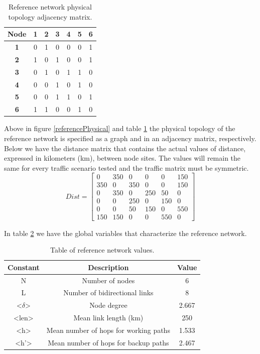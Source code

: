\begin{table}[H]
\centering
\begin{tabular}{|c|c|c|c|c|c|c|}
\hline
\textbf{Node} & \textbf{1} & \textbf{2} & \textbf{3} & \textbf{4} & \textbf{5} & \textbf{6} \\ \hline
\textbf{1} & 0 & 1 & 0 & 0 & 0 & 1 \\ \hline
\textbf{2} & 1 & 0 & 1 & 0 & 0 & 1 \\ \hline
\textbf{3} & 0 & 1 & 0 & 1 & 1 & 0 \\ \hline
\textbf{4} & 0 & 0 & 1 & 0 & 1 & 0 \\ \hline
\textbf{5} & 0 & 0 & 1 & 1 & 0 & 1 \\ \hline
\textbf{6} & 1 & 1 & 0 & 0 & 1 & 0 \\ \hline
\end{tabular}
\caption{Reference network physical topology adjacency matrix.}
\label{referenceAdjacency}
\end{table}

Above in figure \ref{referencePhysical} and table \ref{referenceAdjacency} the physical topology of the reference network is specified as a graph and in an adjacency matrix, respectively. Below we have the distance matrix that contains the actual values of distance, expressed in kilometers (km), between node sites. The values will remain the same for every traffic scenario tested and the traffic matrix must be symmetric.  
\[
Dist=
  \begin{bmatrix}
    0 & 350 & 0 & 0 & 0 & 150 \\
    350 & 0 & 350 & 0 & 0 & 150 \\
    0 & 350 & 0 & 250 & 50 & 0 \\
    0 & 0 & 250 & 0 & 150 & 0 \\
    0 & 0 & 50 & 150 & 0 & 550 \\
    150 & 150 & 0 & 0 & 550 & 0
  \end{bmatrix}
\]


In table \ref{table_ref_net1} we have the global variables that characterize the reference network.

\begin{table}[H]
\centering
\begin{tabular}{| c | c | c|}
 \hline
 Constant & Description & Value \\
 \hline\hline
 N & Number of nodes & 6 \\
 L & Number of bidirectional links & 8 \\
 <$\delta$> & Node degree & 2.667 \\
 <len> & Mean link length (km) & 250 \\
 <h> & Mean number of hops for working paths & 1.533 \\
 <h'> & Mean number of hops for backup paths & 2.467 \\
 \hline
\end{tabular}
\caption{Table of reference network values.}
\label{table_ref_net1}
\end{table}

